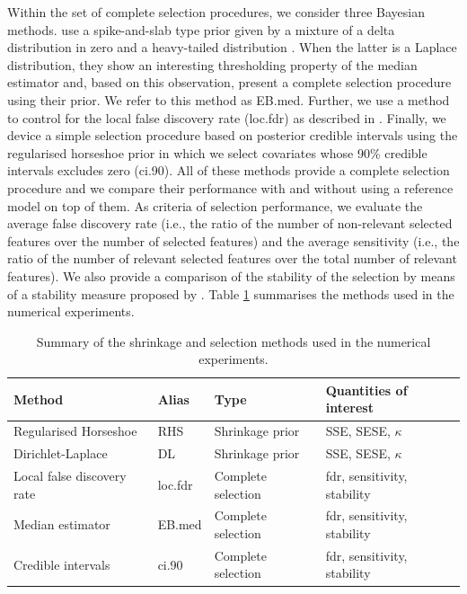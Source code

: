 \documentclass[american,]{article}
\theoremstyle{definition}
\begin{document}
Within the set of complete selection procedures, we consider three
Bayesian methods.  \cite{johnstone2004needles} use a spike-and-slab
type prior given by a mixture of a delta distribution in zero and a
heavy-tailed distribution \cite[see
also][]{paper:spike_slab_mitchell}. When the latter is a Laplace
distribution, they show an interesting thresholding property of the
median estimator and, based on this observation, present a complete
selection procedure using their prior. We refer to this method as
EB.med. Further, we use a method to control for the local false
discovery rate (loc.fdr) as described in \cite{paper:efron,
  efron2012large}. Finally, we device a simple selection procedure
based on posterior credible intervals using the regularised horseshoe
prior in which we select covariates whose 90\% credible intervals
excludes zero (ci.90). All of these methods provide a complete
selection procedure and we compare their performance with and without
using a reference model on top of them. As criteria of selection
performance, we evaluate the average false discovery rate (i.e., the
ratio of the number of non-relevant selected features over the number
of selected features) and the average sensitivity (i.e., the ratio of
the number of relevant selected features over the total number of
relevant features). We also provide a comparison of the stability of
the selection by means of a stability measure proposed by
\cite{paper:stability}. Table \ref{tab:comparison} summarises the
methods used in the numerical experiments.

\begin{table}[tp]
\scriptsize
\centering
\begin{tabular}{l|l|l|l}
  \hline
 Method & Alias & Type & Quantities of interest \\ 
  \hline
 Regularised Horseshoe & RHS & Shrinkage prior & SSE, SESE, $\kappa$ \\
 Dirichlet-Laplace & DL & Shrinkage prior & SSE, SESE, $\kappa$ \\
 Local false discovery rate & loc.fdr & Complete selection & fdr, sensitivity, stability \\
 Median estimator & EB.med & Complete selection & fdr, sensitivity, stability \\
 Credible intervals & ci.90 & Complete selection & fdr, sensitivity, stability \\
 \hline
\end{tabular}
\caption{Summary of the shrinkage and selection methods used in the numerical experiments.}
\label{tab:comparison}
\end{table}
\end{document}
